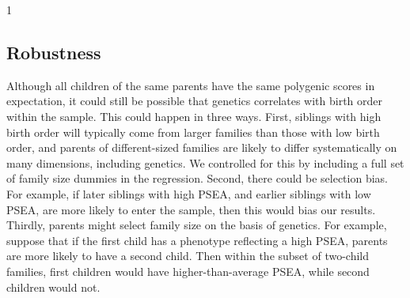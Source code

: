 \documentclass[
]{article}
\begin{document}
\begin{table}[ht]
\begin{centerbox}
\begin{threeparttable}
\begin{tabularx}{1\textwidth}
 \tabularnewline[-0.5pt]


\hhline{}
\end{tabularx}
\end{threeparttable}\par\end{centerbox}

\end{table}
 

\FloatBarrier

\hypertarget{robustness}{%
\subsection{Robustness}\label{robustness}}

Although all children of the same parents have the same polygenic scores
in expectation, it could still be possible that genetics correlates with
birth order within the sample. This could happen in three ways. First,
siblings with high birth order will typically come from larger families
than those with low birth order, and parents of different-sized families
are likely to differ systematically on many dimensions, including
genetics. We controlled for this by including a full set of family size
dummies in the regression. Second, there could be selection bias. For
example, if later siblings with high PSEA, and earlier siblings with low
PSEA, are more likely to enter the sample, then this would bias our
results. Thirdly, parents might select family size on the basis of
genetics. For example, suppose that if the first child has a phenotype
reflecting a high PSEA, parents are more likely to have a second child.
Then within the subset of two-child families, first children would have
higher-than-average PSEA, while second children would not.
\end{document}
